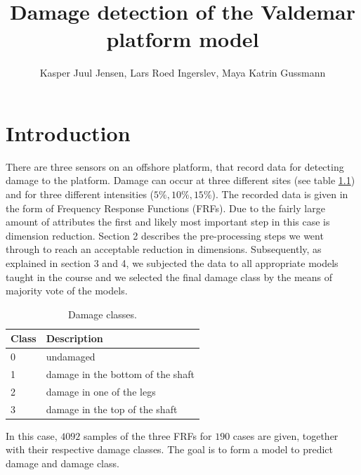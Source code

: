 \documentclass[a4paper,draft=false]{scrreprt}\usepackage[]{graphicx}\usepackage[]{color}
\title{Damage detection of the Valdemar platform model}
\author{Kasper Juul Jensen, Lars Roed Ingerslev, Maya Katrin Gussmann}
\begin{document}
\maketitle



\chapter{Introduction} %

There are three sensors on an offshore platform, that record data for detecting damage to the platform. Damage can occur at three different sites (see table \ref{table:damageclass}) and for three different intensities ($5\%, 10\%, 15\%$). The recorded data is given in the form of Frequency Response Functions (FRFs).
Due to the fairly large amount of attributes the first and likely most important step in this case is dimension reduction. Section 2 describes the pre-processing steps we went through to reach an acceptable reduction in dimensions. Subsequently, as explained in section 3 and 4, we subjected the data to all appropriate models taught in the course and we selected the final damage class by the means of majority vote of the models.   

\begin{table}[ht]
\begin{center}
\begin{tabular}{ll}
  \hline
  Class & Description\\\hline
  0 & undamaged\\
  1 & damage in the bottom of the shaft\\
  2 & damage in one of the legs\\
  3 & damage in the top of the shaft\\
  \hline
\end{tabular}
\caption{Damage classes.\label{table:damageclass}}
\end{center}
\end{table}

In this case, $4092$ samples of the three FRFs for $190$ cases are given, together with their respective damage classes. The goal is to form a model to predict damage and damage class.

\end{document}
